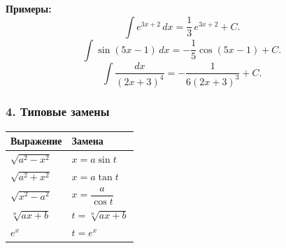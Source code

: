 \textbf{Примеры:}
\[
\int e^{3x+2}\,dx = \frac{1}{3}\,e^{3x+2} + C.
\]
\[
\int \sin(5x - 1)\,dx = -\frac{1}{5}\cos(5x-1) + C.
\]
\[
\int \frac{dx}{(2x+3)^4} = -\frac{1}{6(2x+3)^3} + C.
\]

\subsubsection*{4. Типовые замены}

\begin{center}
\renewcommand{\arraystretch}{1.5}
\begin{tabular}{|l|l|}
\hline
\textbf{Выражение} & \textbf{Замена} \\
\hline
$\sqrt{a^2 - x^2}$ & $x = a\sin t$ \\
$\sqrt{a^2 + x^2}$ & $x = a\tan t$ \\
$\sqrt{x^2 - a^2}$ & $x = \dfrac{a}{\cos t}$ \\
$\sqrt[n]{ax+b}$ & $t = \sqrt[n]{ax+b}$ \\
$e^x$ & $t = e^x$ \\
\hline
\end{tabular}
\end{center}